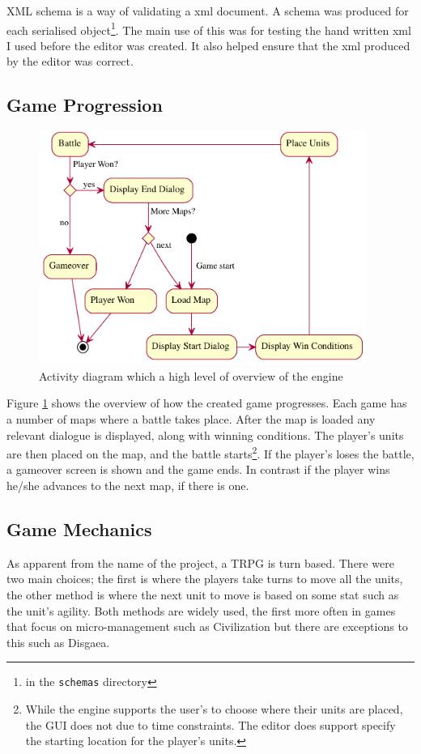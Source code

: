 XML schema is a way of validating a  xml document. A schema was produced for each serialised object\footnote{in the \texttt{schemas} directory}. 
The main use of this was for testing the hand written xml I used before the editor was created. It also helped ensure that the xml produced by the editor was correct.  

\subsection{Game Progression}
\begin{figure}[htbp]
	\centering
		\includegraphics[height=3in]{figures/game.pdf}
	\caption{Activity diagram which a high level of overview of the engine}
	\label{fig:figures_game}
\end{figure}

Figure \ref{fig:figures_game} shows the overview of how the created game progresses.  Each game has a number of maps where a battle takes place. After the map is loaded any relevant dialogue is displayed, along with winning conditions. The player's units are then placed on the map, and the battle starts\footnote{While the engine supports the user's to choose where their units are placed, the GUI does not due to time constraints. The editor does support specify the starting location for the player's units.}. If the player's loses the battle, a gameover screen is shown and the game ends. In contrast if the player wins he/she advances to the next map, if there is one.    

\subsection{Game Mechanics}
As apparent from the name of the project, a TRPG is turn based.  There were two main choices; the first is where the players take turns to move all the units, the other method is where the next unit to move is based on some stat such as the unit's agility. Both methods are widely used,  the first more often in games that focus on micro-management such as Civilization but there are exceptions to this such as Disgaea. 

